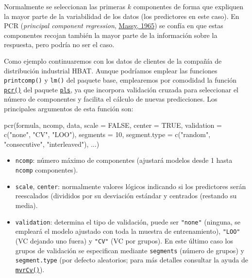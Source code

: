 \documentclass[
]{book}
\newenvironment{Shaded}{\begin{snugshade}}{\end{snugshade}}
\newcommand{\AttributeTok}[1]{\textcolor[rgb]{0.77,0.63,0.00}{#1}}
\newcommand{\ConstantTok}[1]{\textcolor[rgb]{0.00,0.00,0.00}{#1}}
\newcommand{\DecValTok}[1]{\textcolor[rgb]{0.00,0.00,0.81}{#1}}
\newcommand{\FunctionTok}[1]{\textcolor[rgb]{0.00,0.00,0.00}{#1}}
\newcommand{\NormalTok}[1]{#1}
\newcommand{\StringTok}[1]{\textcolor[rgb]{0.31,0.60,0.02}{#1}}
\theoremstyle{break}
\theoremstyle{nonumberplain}
\begin{document}
Normalmente se seleccionan las primeras \(k\) componentes de forma que expliquen la mayor parte de la variabilidad de los datos (los predictores en este caso).
En PCR (\emph{principal component regression}, \protect\hyperlink{ref-massy1965principal}{Massy, 1965}) se confía en que estas componentes recojan también la mayor parte de la información sobre la respuesta, pero podría no ser el caso.

Como ejemplo continuaremos con los datos de clientes de la compañía de distribución industrial HBAT.
Aunque podríamos emplear las funciones \texttt{printcomp()} y \texttt{lm()} del paquete base, emplearemos por comodidad la función \href{https://rdrr.io/pkg/pls/man/mvr.html}{\texttt{pcr()}} del paquete \href{https://mevik.net/work/software/pls.html}{\texttt{pls}}, ya que incorpora validación cruzada para seleccionar el número de componentes y facilita el cálculo de nuevas predicciones.
Los principales argumentos de esta función son:

\begin{Shaded}
\begin{Highlighting}[]
\FunctionTok{pcr}\NormalTok{(formula, ncomp, data, }\AttributeTok{scale =} \ConstantTok{FALSE}\NormalTok{, }\AttributeTok{center =} \ConstantTok{TRUE}\NormalTok{, }
    \AttributeTok{validation =} \FunctionTok{c}\NormalTok{(}\StringTok{"none"}\NormalTok{, }\StringTok{"CV"}\NormalTok{, }\StringTok{"LOO"}\NormalTok{), }\AttributeTok{segments =} \DecValTok{10}\NormalTok{, }
    \AttributeTok{segment.type =} \FunctionTok{c}\NormalTok{(}\StringTok{"random"}\NormalTok{, }\StringTok{"consecutive"}\NormalTok{, }\StringTok{"interleaved"}\NormalTok{), ...)}
\end{Highlighting}
\end{Shaded}

\begin{itemize}
\item
  \texttt{ncomp}: número máximo de componentes (ajustará modelos desde 1 hasta \texttt{ncomp} componentes).
\item
  \texttt{scale}, \texttt{center}: normalmente valores lógicos indicando si los predictores serán reescalados (divididos por su desviación estándar y centrados (restando su media).
\item
  \texttt{validation}: determina el tipo de validación, puede ser \texttt{"none"} (ninguna, se empleará el modelo ajustado con toda la muestra de entrenamiento), \texttt{"LOO"} (VC dejando uno fuera) y \texttt{"CV"} (VC por grupos). En este último caso los grupos de validación se especifican mediante \texttt{segments} (número de grupos) y \texttt{segment.type} (por defecto aleatorios; para más detalles consultar la ayuda de \href{https://rdrr.io/pkg/pls/man/mvrCv.html}{\texttt{mvrCv()}}).
\end{itemize}
\end{document}
